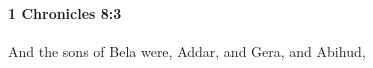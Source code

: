 
		\paragraph{1 Chronicles 8:3} %
			\label{1CHRONICLES-8-3}

			And the sons of Bela were, Addar, and Gera, and Abihud,


